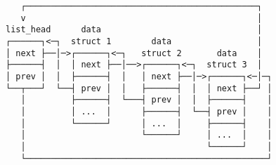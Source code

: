 \documentclass[varwidth=45em]{standalone}
\begin{document}
\begin{verbatim}
   ┌──────────────────────────────────────────────┐
   v                                              │
list_head      data                               │
┌──────┐<─┐  struct 1        data                 │
│ next ├──│─>┌──────┐<─┐   struct 2       data    │
├──────┤  │  │ next ├──│──>┌──────┐<─┐  struct 3  │
│ prev │  │  ├──────┤  │   │ next ├──│─>┌──────┐<─│─┐
└──┬───┘  └──┤ prev │  │   ├──────┤  │  │ next ├──┘ │
   │         ├──────┤  └───┤ prev │  │  ├──────┤    │
   │         │ ...  │      ├──────┤  └──┤ prev │    │
   │         └──────┘      │ ...  │     ├──────┤    │
   │                       └──────┘     │ ...  │    │
   │                                    └──────┘    │
   └────────────────────────────────────────────────┘
\end{verbatim}
\end{document}
